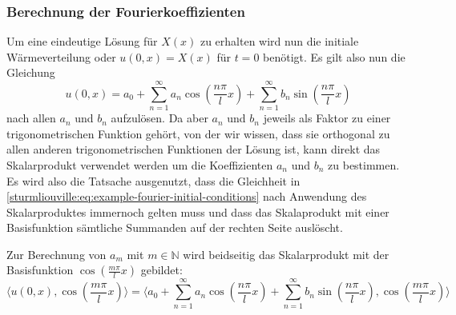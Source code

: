 \subsubsection{Berechnung der Fourierkoeffizienten}

%
%

Um eine eindeutige Lösung für $X(x)$ zu erhalten wird nun die initiale
Wärmeverteilung oder $u(0, x) = X(x)$ für $t = 0$ benötigt.
Es gilt also nun die Gleichung
\begin{equation}
    \label{sturmliouville:eq:example-fourier-initial-conditions}
    u(0, x)
    =
    a_0
    +
    \sum_{n = 1}^{\infty} a_n\cos\left(\frac{n\pi}{l}x\right)
    +
    \sum_{n = 1}^{\infty} b_n\sin\left(\frac{n\pi}{l}x\right)
\end{equation}
nach allen $a_n$ und $b_n$ aufzulösen.
Da aber $a_n$ und $b_n$ jeweils als Faktor zu einer trigonometrischen Funktion
gehört, von der wir wissen, dass sie orthogonal zu allen anderen
trigonometrischen Funktionen der Lösung ist, kann direkt das Skalarprodukt
verwendet werden um die Koeffizienten $a_n$ und $b_n$ zu bestimmen.
Es wird also die Tatsache ausgenutzt, dass die Gleichheit in
\eqref{sturmliouville:eq:example-fourier-initial-conditions} nach Anwendung des
Skalarproduktes immernoch gelten muss und dass das Skalaprodukt mit einer
Basisfunktion sämtliche Summanden auf der rechten Seite auslöscht.

Zur Berechnung von $a_m$ mit $ m \in \mathbb{N} $ wird beidseitig das
Skalarprodukt mit der Basisfunktion $ \cos\left(\frac{m \pi}{l}x\right)$
gebildet:
\begin{equation}
    \label{sturmliouville:eq:dot-product-cosine}
    \langle u(0, x), \cos\left(\frac{m \pi}{l}x\right) \rangle
    =
    \langle a_0
    +
    \sum_{n = 1}^{\infty} a_n\cos\left(\frac{n\pi}{l}x\right)
    +
    \sum_{n = 1}^{\infty} b_n\sin\left(\frac{n\pi}{l}x\right),
    \cos\left(\frac{m \pi}{l}x\right)\rangle
\end{equation}

